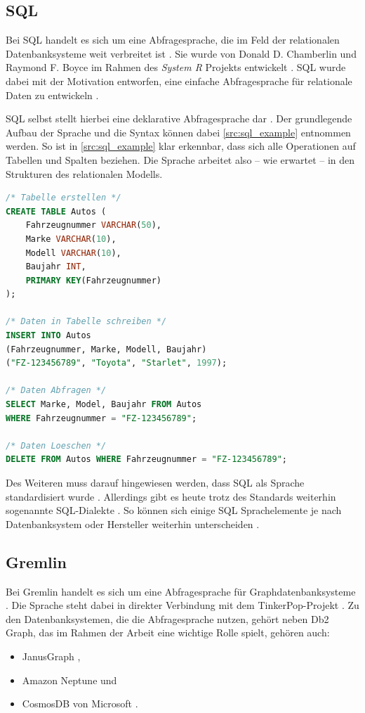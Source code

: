 \subsection{SQL}
Bei SQL handelt es sich um eine Abfragesprache, die im Feld der relationalen Datenbanksysteme weit verbreitet ist \cite{sql_history}. Sie wurde von Donald D. Chamberlin und Raymond F. Boyce im Rahmen des \textit{System R} Projekts entwickelt \cite{sql_history}. SQL wurde dabei mit der Motivation entworfen, eine einfache Abfragesprache für relationale Daten zu entwickeln \cite{sql_history}. 

SQL selbst stellt hierbei eine deklarative Abfragesprache dar \cite{sql_history}. Der grundlegende Aufbau der Sprache und die Syntax können dabei \autoref{src:sql_example} entnommen werden. So ist in \autoref{src:sql_example} klar erkennbar, dass sich alle Operationen auf Tabellen und Spalten beziehen. Die Sprache arbeitet also -- wie erwartet -- in den Strukturen des relationalen Modells.

\begin{lstlisting}[caption={Beispiel SQL-Queries},language=SQL,label=src:sql_example]
/* Tabelle erstellen */
CREATE TABLE Autos (
    Fahrzeugnummer VARCHAR(50), 
    Marke VARCHAR(10), 
    Modell VARCHAR(10), 
    Baujahr INT,
    PRIMARY KEY(Fahrzeugnummer)
);

/* Daten in Tabelle schreiben */
INSERT INTO Autos 
(Fahrzeugnummer, Marke, Modell, Baujahr) 
("FZ-123456789", "Toyota", "Starlet", 1997);

/* Daten Abfragen */
SELECT Marke, Model, Baujahr FROM Autos 
WHERE Fahrzeugnummer = "FZ-123456789";

/* Daten Loeschen */
DELETE FROM Autos WHERE Fahrzeugnummer = "FZ-123456789";
\end{lstlisting}

Des Weiteren muss darauf hingewiesen werden, dass SQL als Sprache standardisiert wurde \cite{sql_history}. Allerdings gibt es heute trotz des Standards weiterhin sogenannte SQL-Dialekte \cite{sql_2017}. So können sich einige SQL Sprachelemente je nach Datenbanksystem oder Hersteller weiterhin unterscheiden \cite{sql_2017}. 

\subsection{Gremlin}

Bei Gremlin handelt es sich um eine Abfragesprache für  Graphdatenbanksysteme \cite{tinkerpop_2020}. Die Sprache steht dabei in direkter Verbindung mit dem TinkerPop-Projekt  \cite{tinkerpop_2020}. Zu den Datenbanksystemen, die die Abfragesprache nutzen, gehört neben Db2 Graph, das im Rahmen der Arbeit eine wichtige Rolle spielt, gehören auch:
\begin{itemize}
    \item JanusGraph \cite{janusgraph_2020},
    \item Amazon Neptune \cite{neptune_2021} und 
    \item CosmosDB von Microsoft \cite{cosmosdb_2021}.
\end{itemize}


